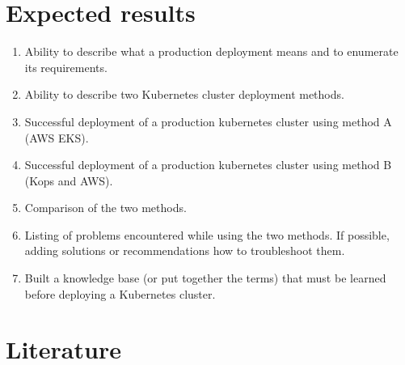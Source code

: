 \documentclass[12pt]{article}
\begin{document}
\section{Expected results}
\begin{enumerate}
    \item Ability to describe what a production deployment means and to enumerate its requirements.
    \item Ability to describe two Kubernetes cluster deployment methods.
    \item Successful deployment of a production kubernetes cluster using method A (AWS EKS).
    \item Successful deployment of a production kubernetes cluster using method B (Kops and AWS).
    \item Comparison of the two methods.
    \item Listing of problems encountered while using the two methods. If possible, adding solutions or recommendations how to troubleshoot them.
    \item Built a knowledge base (or put together the terms) that must be learned before deploying a Kubernetes cluster.
\end{enumerate}

\section{Literature}
\end{document}
